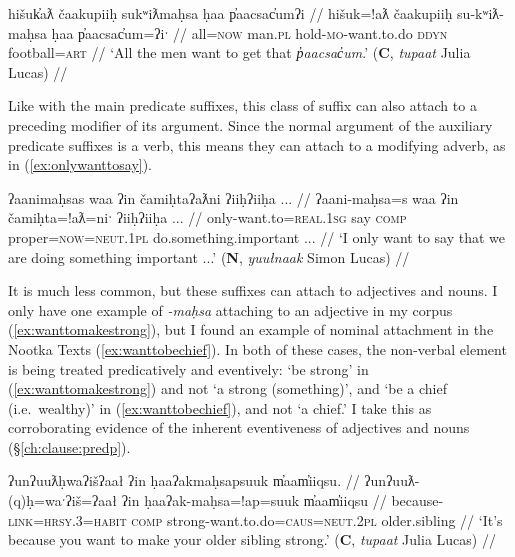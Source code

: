 \ex \label{ex:wanttograb}
\begingl
\glpreamble hišuk̓aƛ čaakupiiḥ sukʷiƛmaḥsa ḥaa p̓aacsac̓umʔi //
\gla hišuk=!aƛ čaakupiiḥ su-kʷiƛ-maḥsa ḥaa p̓aacsac̓um=ʔiˑ //
\glb all=\textsc{now} man.\textsc{pl} hold-\textsc{mo}-want.to.do \textsc{ddyn} football\footnotemark=\textsc{art} //
\glft `All the men want to get that \textit{p̓aacsac̓um}.' (\textbf{C}, \textit{tupaat} Julia Lucas) //
\endgl
\xe



Like with the main predicate suffixes, this class of suffix can also attach to a preceding modifier of its argument. Since the normal argument of the auxiliary predicate suffixes is a verb, this means they can attach to a modifying adverb, as in (\ref{ex:onlywanttosay}).

\ex \label{ex:onlywanttosay}
\begingl
\glpreamble ʔaanimaḥsas waa ʔin čamiḥtaʔaƛni ʔiiḥʔiiḥa ... //
\gla ʔaani-maḥsa=s waa ʔin čamiḥta=!aƛ=niˑ ʔiiḥʔiiḥa ... //
\glb only-want.to=\textsc{real.1sg} say \textsc{comp} proper=\textsc{now}=\textsc{neut.1pl} do.something.important ... //
\glft `I only want to say that we are doing something important ...' (\textbf{N}, \textit{yuułnaak} Simon Lucas) //
\endgl
\xe

It is much less common, but these suffixes can attach to adjectives and nouns. I only have one example of \textit{-maḥsa} attaching to an adjective in my corpus (\ref{ex:wanttomakestrong}), but I found an example of nominal attachment in the Nootka Texts (\ref{ex:wanttobechief}). In both of these cases, the non-verbal element is being treated predicatively and eventively: `be strong' in (\ref{ex:wanttomakestrong}) and not `a strong (something)', and `be a chief (i.e.\ wealthy)' in (\ref{ex:wanttobechief}), and not `a chief.' I take this as corroborating evidence of the inherent eventiveness of adjectives and nouns (\S\ref{ch:clause:predp}).

\ex \label{ex:wanttomakestrong}
\begingl
\glpreamble ʔunʔuuƛḥwaʔišʔaał ʔin ḥaaʔakmaḥsapsuuk m̓aam̓iiqsu. //
\gla ʔunʔuuƛ-(q)ḥ=waˑʔiš=ʔaał ʔin ḥaaʔak-maḥsa=!ap=suuk m̓aam̓iiqsu //
\glb because-\textsc{link}=\textsc{hrsy.3}=\textsc{habit} \textsc{comp} strong-want.to.do=\textsc{caus}=\textsc{neut.2pl} older.sibling //
\glft `It's because you want to make your older sibling strong.' (\textbf{C}, \textit{tupaat} Julia Lucas) //
\endgl
\xe

